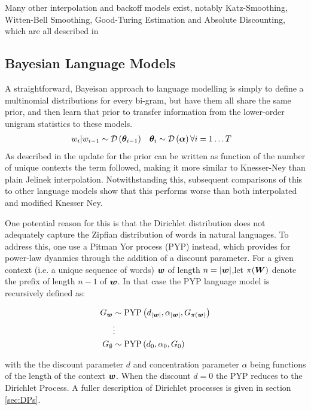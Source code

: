 Many other interpolation and backoff models exist, notably Katz-Smoothing, Witten-Bell Smoothing, Good-Turing Estimation and Absolute Discounting, which are all described in \cite{Goodman2001}

\subsection*{Bayesian Language Models}
A straightforward, Bayeisan approach to language modelling is simply to define a multinomial distributions for every bi-gram, but have them all share the same prior, and then learn that prior to transfer information from the lower-order unigram statistics to these models.
\begin{align}
w_i|w_{i-1} & \sim \mathcal{D} \left( {\bm \theta_{i-1}} \right) & \bm \theta_i & \sim \mathcal{D} \left( {\bm \alpha} \right) \forall i = 1\ldots T
\end{align}
As described in\cite{MacKay1995} the update for the prior can be written as function of the number of unique contexts the term followed, making it more similar to Knesser-Ney than plain Jelinek interpolation. Notwithstanding this, subsequent comparisons of this to other language models show\cite{Teh} that this performs worse than both interpolated and modified Knesser Ney.

One potential reason for this is that the Dirichlet distribution does not adequately capture the Zipfian distribution of words in natural languages. To address this, one use a Pitman Yor process (PYP) instead, which provides for power-law dyanmics through the addition of a discount parameter. For a given context (i.e. a unique sequence of words) $\bm w$ of length $n = |\bm w|$,let $\pi(\bm W)$ denote the prefix of length $n-1$ of $\bm w$. In that case the PYP language model is recursively defined as\cite{Teh}:

\begin{align}
G_{\bm w} & \sim \text{PYP}\left(d_{|\bm w|}, \alpha_{|\bm w|}, G_{\pi(\bm w)} \right) \\
& \vdots \\
G_{\emptyset} &\sim \text{PYP}\left(d_0, \alpha_0, G_0\right)
\end{align}

with the the discount parameter $d$ and concentration parameter $\alpha$ being functions of the length of the context $\bm w$. When the discount $d=0$ the PYP reduces to the Dirichlet Process. A fuller description of Dirichlet processes is given in section \ref{sec:DPs}.

